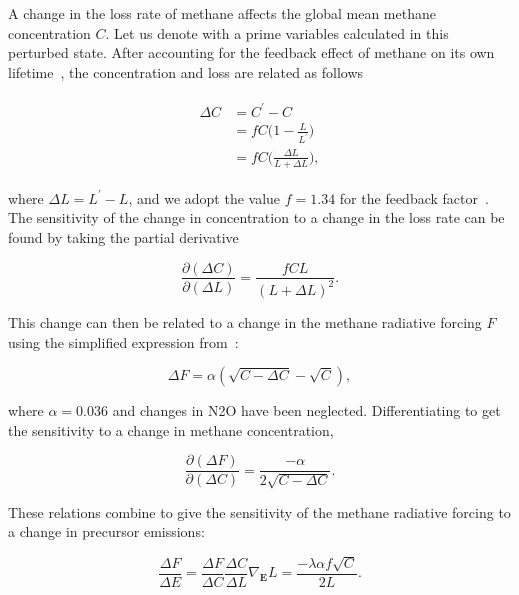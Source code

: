 A change in the loss rate of methane affects the global mean methane concentration $C$. Let us denote with a prime variables calculated in this perturbed state. After accounting for the feedback effect of methane on its own lifetime~\citep{ref:fuglestvedt1999,ref:naik2005}, the concentration and loss are related as follows

\begin{equation}
\begin{align}
\begin{split}
\Delta C &= C^{\prime} - C \\
         &= f C \Big(1 - \frac{L}{L^{\prime}}\Big) \\
         &= fC\Big(\frac{\Delta L}{L+\Delta L}\Big),
\label{eqn:dc}
\end{split}
\end{align}
\end{equation}

where $\Delta L = L^{\prime}-L$, and we adopt the value $f=1.34$ for the feedback factor~\citep{ref:holmes2013}. The sensitivity of the change in concentration to a change in the loss rate can be found by taking the partial derivative

\begin{equation}
\frac{\partial (\Delta C)}{\partial (\Delta L)} = \frac{fCL}{(L+\Delta L)^2}.
\end{equation}

This change can then be related to a change in the methane radiative forcing $F$ using the simplified expression from~\citet{ref:myhre1998}:

\begin{equation}
\Delta F = \alpha (\sqrt{C-\Delta C} - \sqrt{C}),
\end{equation}

where $\alpha=0.036$ and changes in N2O have been neglected. Differentiating to get the sensitivity to a change in methane concentration,

\begin{equation}
\frac{\partial (\Delta F)}{\partial (\Delta C)} = \frac{-\alpha}{2\sqrt{C-\Delta C}}.
\end{equation}

These relations combine to give the sensitivity of the methane radiative forcing to a change in precursor emissions:

\begin{equation}
\frac{\Delta F}{\Delta E} = \frac{\Delta F}{\Delta C} \frac{\Delta C}{\Delta L} \nabla_{\mathbf{E}} L = \frac{-\lambda \alpha f \sqrt{C}}{2L}.
\end{equation}

